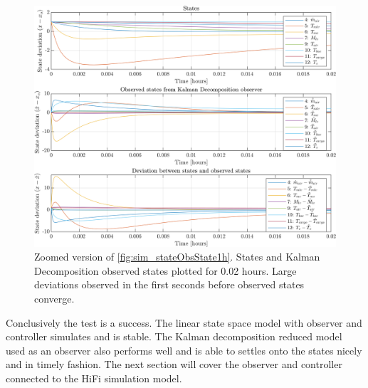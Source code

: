 \begin{figure}[h!]
	\centering
	\includegraphics[width=1\textwidth]{Graphics/fig_stateObsState002h.png}
	\caption{Zoomed version of \cref{fig:sim_stateObsState1h}. States and Kalman Decomposition observed states plotted for 0.02 hours. Large deviations observed in the first seconds before observed states converge.}
	\label{fig:sim_stateObsState002h}
\end{figure}

Conclusively the test is a success. The linear state space model with observer  and controller simulates and is stable. The Kalman decomposition reduced model used as an observer also performs well and is able to settles onto the states nicely and in timely fashion. The next section will cover the observer and controller connected to the HiFi simulation model.
